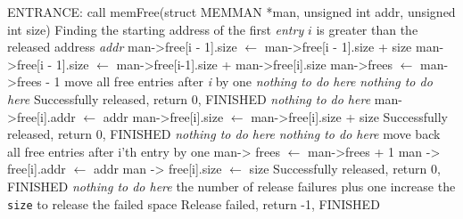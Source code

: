 \documentclass{standalone}
\begin{document}
\begin{algorithm}[H]
  \SetAlgoLined

  ENTRANCE: call memFree{(struct MEMMAN *man, unsigned int addr, unsigned int size)}\;
  {
    Finding the starting address of the first \emph{entry} $i$ is greater than the released
    address \emph{addr}\;
    {
      {
        man->free[i - 1].size $\leftarrow$ man->free[i - 1].size + size\;
        {
          {
            man->free[i - 1].size $\leftarrow$ man->free[i-1].size + man->free[i].size\;
            man->frees $\leftarrow$ man->frees - 1\;
            move all free entries after \emph{i} by one\;
          }
          {
            \emph{nothing to do here}\;
          }
        }
        {
          \emph{nothing to do here}\;
        }
      }
      {
        Successfully released, return 0, FINISHED\;
      }
    }
    {
      \emph{nothing to do here}\;
    }
    {
      {
        man->free[i].addr $\leftarrow$ addr\;
        man->free[i].size $\leftarrow$ man->free[i].size + size\;
        Successfully released, return 0, FINISHED\;
      }
      {
        \emph{nothing to do here}\;
      }
    }
    {
      \emph{nothing to do here}\;
    }
    {
      move back all free entries after i'th entry by one\;
      man-> frees $\leftarrow$ man->frees + 1\;
      man -> free[i].addr $\leftarrow$ addr\;
      man -> free[i].size $\leftarrow$ size\;
      Successfully released, return 0, FINISHED\;
    }
    {
      \emph{nothing to do here}\;
    }
    the number of release failures plus one\;
    increase the \texttt{size} to release the failed space\;
    Release failed, return -1, FINISHED\;
  }
\end{algorithm}
\end{document}
